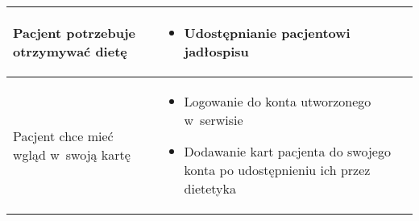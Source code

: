 \begin{minipage}{\textwidth}
\begin{table}[H]
\begin{tabular}{|P{.3\textwidth}|P{.6\textwidth}|}
            \hline
            Pacjent potrzebuje otrzymywać dietę &
            \begin{itemize}
                \item Udostępnianie pacjentowi jadłospisu
            \end{itemize} \\
            \hline
            Pacjent chce mieć wgląd w~swoją kartę &
            \begin{itemize}
                \item Logowanie do konta utworzonego w~serwisie
                \item Dodawanie kart pacjenta do swojego konta po udostępnieniu ich przez dietetyka
            \end{itemize} \\
            \hline
            \hline
        \end{tabular}
    \end{table}
\end{minipage}


